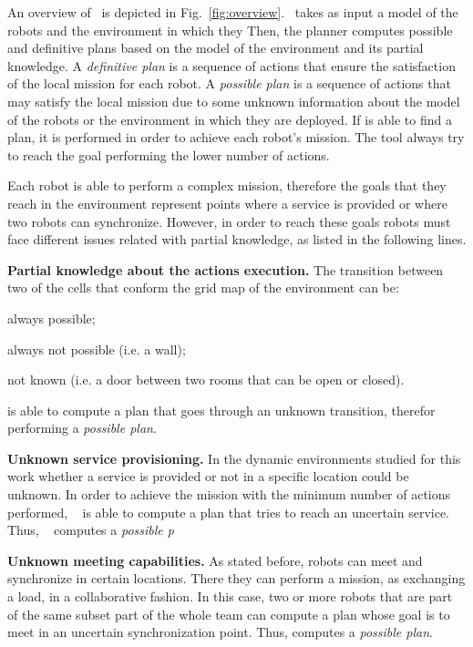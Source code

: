 
An overview of \toolName\ is depicted in Fig.~\ref{fig:overview}.
\toolName\ takes as input a model of the robots and the environment in which they
Then, the planner computes possible and definitive plans based on the model of the environment and its partial knowledge.
A \emph{definitive plan} is a sequence of actions that ensure the satisfaction of the local mission for each robot. 
A \emph{possible plan} is a sequence of actions that may satisfy the local mission due to some unknown information about the model of the robots or the environment in which they are deployed. 
If \toolName is able to find a plan, it is performed in order to achieve each robot's mission.
The tool always try to reach the goal performing the lower number of actions.

Each robot is able to perform a complex mission, therefore the goals that they reach in the environment represent points where a service is provided or where two robots can synchronize.
However, in order to reach these goals robots must face different issues related with partial knowledge, as listed in the following lines.

\textbf{Partial knowledge about the actions execution.} 
The transition between two of the cells that conform the grid map of the environment can be:
\begin{enumerate*}
\item always possible;
\item always not possible (i.e. a wall);
\item not known (i.e. a door between two rooms that can be open or closed).
\end{enumerate*}
\toolName is able to compute a plan that goes through an unknown transition, therefor performing a \emph{possible plan}.

\textbf{Unknown service provisioning.} 
In the dynamic environments studied for this work whether a service is provided or not in a specific location could be unknown. 
In order to achieve the mission with the minimum number of actions performed, \toolName~ is able to compute a plan that tries to reach an uncertain service.
Thus, \toolName~ computes a \emph{possible p}

\textbf{Unknown meeting capabilities.} 
As stated before, robots can meet and synchronize in certain locations.
There they can perform a mission, as exchanging a load, in a collaborative fashion.
In this case, two or more robots that are part of the same subset part of the whole team can compute a plan whose goal is to meet in an uncertain synchronization point.
Thus, \toolName computes a \emph{possible plan}.

